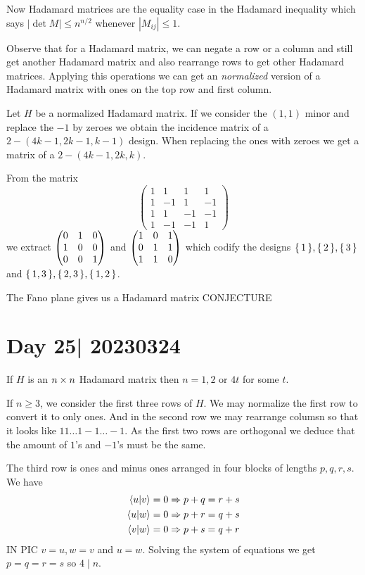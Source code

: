 \documentclass[12pt]{memoir}
\begin{document}
Now Hadamard matrices are the equality case in the Hadamard inequality which says $|\det M|\leq n^{n/2}$ whenever $|M_{ij}|\leq 1$.\par 
Observe that for a Hadamard matrix, we can negate a row or a column and still get another Hadamard matrix and also rearrange rows to get other Hadamard matrices. Applying this operations we can get an \emph{normalized} version of a Hadamard matrix with ones on the top row and first column.

\begin{Prop}
    Let $H$ be a normalized Hadamard matrix. If we consider the $(1,1)$ minor and replace the $-1$ by zeroes we obtain the incidence matrix of a $2-(4k-1,2k-1,k-1)$ design. When replacing the ones with zeroes we get a matrix of a $2-(4k-1,2k,k)$.
\end{Prop}

\begin{Ex}
    From the matrix 
    $$\begin{pmatrix}
        1&1&1&1\\1&-1&1&-1\\1&1&-1&-1\\1&-1&-1&1
    \end{pmatrix}$$
    we extract $\begin{pmatrix} 0 & 1 & 0 \\ 1 & 0 & 0 \\ 0 & 0 & 1 \end{pmatrix}$ and $\begin{pmatrix} 1 & 0 & 1 \\ 0 & 1 & 1 \\ 1 & 1 & 0 \end{pmatrix}$ which codify the designs $\{\,1\,\},\{\,2\,\},\{\,3\,\}$ and $\{\,1,3\,\},\{\,2,3\,\},\{\,1,2\,\}$.
\end{Ex}

The Fano plane gives us a Hadamard matrix CONJECTURE

\section{Day 25| 20230324}

\begin{Lem}
    If $H$ is an $n\times n$ Hadamard matrix then $n=1,2$ or $4t$ for some $t$.
\end{Lem}

\begin{ptcbp}
    If $n\geq 3$, we consider the first three rows of $H$. We may normalize the first row to convert it to only ones. And in the second row we may rearrange columsn so that it looks like $11\dots1-1\dots-1$. As the first two rows are orthogonal we deduce that the amount of $1$'s and $-1$'s must be the same.\par 
    The third row is ones and minus ones arranged in four blocks of lengths $p,q,r,s$. We have 
    \begin{align*}
        \braket{u}{v}=0\Rightarrow p+q=r+s\\
        \braket{u}{w}=0\Rightarrow p+r=q+s\\
        \braket{v}{w}=0\Rightarrow p+s=q+r\\
    \end{align*}
    IN PIC $v=u,w=v$ and $u=w$. Solving the system of equations we get $p=q=r=s$ so $4\mid n$.
\end{ptcbp}
\end{document}
